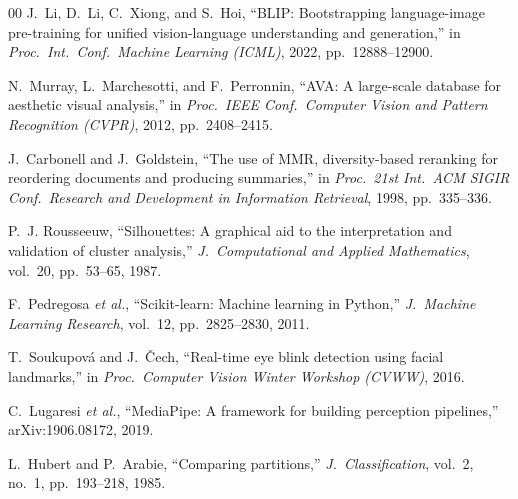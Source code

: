 \documentclass[conference]{IEEEtran}
\begin{document}
\begin{thebibliography}{00}
J.~Li, D.~Li, C.~Xiong, and S.~Hoi,
``BLIP: Bootstrapping language-image pre-training for unified vision-language understanding and generation,''
in \emph{Proc.\ Int.\ Conf.\ Machine Learning (ICML)}, 2022, pp.~12888--12900.

N.~Murray, L.~Marchesotti, and F.~Perronnin,
``AVA: A large-scale database for aesthetic visual analysis,''
in \emph{Proc.\ IEEE Conf.\ Computer Vision and Pattern Recognition (CVPR)},
2012, pp.~2408--2415.

J.~Carbonell and J.~Goldstein,
``The use of MMR, diversity-based reranking for reordering documents and producing summaries,''
in \emph{Proc.\ 21st Int.\ ACM SIGIR Conf.\ Research and Development in Information Retrieval},
1998, pp.~335--336.

P.~J. Rousseeuw,
``Silhouettes: A graphical aid to the interpretation and validation of cluster analysis,''
\emph{J.\ Computational and Applied Mathematics}, vol.~20, pp.~53--65, 1987.

F.~Pedregosa \emph{et al.},
``Scikit-learn: Machine learning in Python,''
\emph{J.\ Machine Learning Research}, vol.~12, pp.~2825--2830, 2011.

T.~Soukupov\'a and J.~\v{C}ech,
``Real-time eye blink detection using facial landmarks,''
in \emph{Proc.\ Computer Vision Winter Workshop (CVWW)}, 2016.

C.~Lugaresi \emph{et al.},
``MediaPipe: A framework for building perception pipelines,''
arXiv:1906.08172, 2019.

L.~Hubert and P.~Arabie,
``Comparing partitions,''
\emph{J.\ Classification}, vol.~2, no.~1, pp.~193--218, 1985.

\end{thebibliography}
\end{document}
